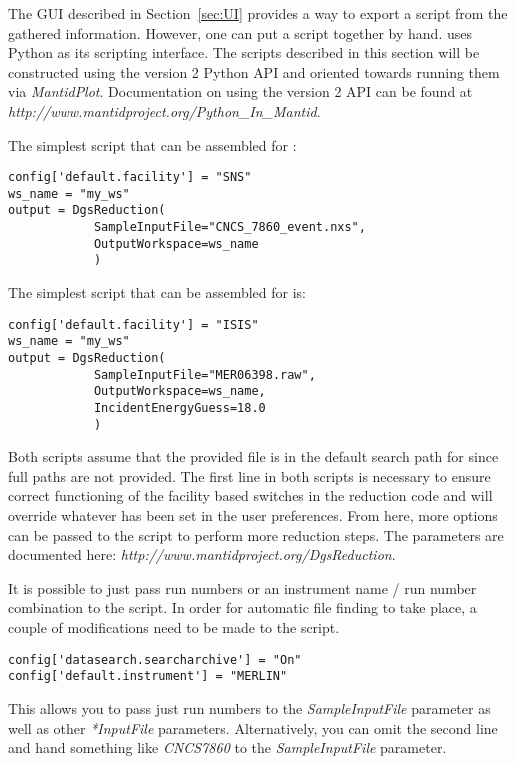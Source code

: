 The GUI described in Section~\ref{sec:UI} provides a way to export a script from the gathered information. However, one can put a script together by hand. \mantid{} uses Python as its scripting interface. The scripts described in this section will be constructed using the version 2 Python API and oriented towards running them via \textit{MantidPlot}. Documentation on using the version 2 API can be found at \textit{http://www.mantidproject.org/Python\_In\_Mantid}.

The simplest script that can be assembled for \sns{}:
\begin{verbatim}
config['default.facility'] = "SNS"
ws_name = "my_ws"
output = DgsReduction(
            SampleInputFile="CNCS_7860_event.nxs",
            OutputWorkspace=ws_name
            )
\end{verbatim}
The simplest script that can be assembled for \isis{} is:
\begin{verbatim}
config['default.facility'] = "ISIS"
ws_name = "my_ws"
output = DgsReduction(
            SampleInputFile="MER06398.raw",
            OutputWorkspace=ws_name,
            IncidentEnergyGuess=18.0
            )
\end{verbatim}
Both scripts assume that the provided file is in the default search path for \mantid{} since full paths are not provided. The first line in both scripts is necessary to ensure correct functioning of the facility based switches in the reduction code and will override whatever has been set in the \mantid{} user preferences. From here, more options can be passed to the script to perform more reduction steps. The parameters are documented here: \textit{http://www.mantidproject.org/DgsReduction}.

It is possible to just pass run numbers or an instrument name / run number combination to the script. In order for automatic file finding to take place, a couple of modifications need to be made to the script. 
\begin{verbatim}
config['datasearch.searcharchive'] = "On"
config['default.instrument'] = "MERLIN"
\end{verbatim}
This allows you to pass just run numbers to the \textit{SampleInputFile} parameter as well as other \textit{*InputFile} parameters. Alternatively, you can omit the second line and hand something like \textit{CNCS7860} to the \textit{SampleInputFile} parameter.

